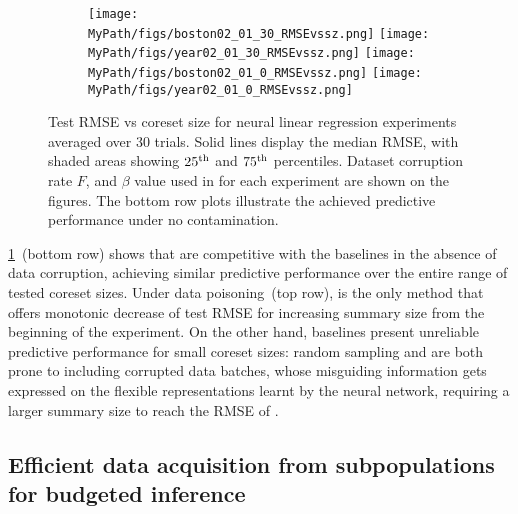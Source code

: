 \begin{figure}[t!]
	\begin{subfigure}[b]{0.9\textwidth} 
		\centering
		\texttt{[image: \\MyPath/figs/boston02\_01\_30\_RMSEvssz.png]}
		\hfill
		\texttt{[image: \\MyPath/figs/year02\_01\_30\_RMSEvssz.png]}
		\centering
		\hfill
		\texttt{[image: \\MyPath/figs/boston02\_01\_0\_RMSEvssz.png]}
		\centering
		\hfill
		\texttt{[image: \\MyPath/figs/year02\_01\_0\_RMSEvssz.png]}
	\end{subfigure}	
	\centering
	\caption{Test RMSE vs coreset size for neural linear regression experiments averaged over 30 trials. Solid lines display the median RMSE, with shaded areas showing $25\textsuperscript{th}$ and $75\textsuperscript{th}$ percentiles. Dataset corruption rate $F$, and $\beta$ value used in \bcores{} for each experiment are shown on the figures. The bottom row plots illustrate the achieved predictive performance under no contamination.}
	\label{fig:neural_plot}
\end{figure}


\cref{fig:neural_plot}~(bottom row) shows that \bcores{} are competitive with the baselines in the absence of data corruption, achieving similar predictive performance over the entire range of tested coreset sizes. Under data poisoning~(top row), \bcores{} is the only method that offers monotonic decrease of test RMSE for increasing summary size from the beginning of the experiment. On the other hand, baselines present unreliable predictive performance for small coreset sizes: random sampling and \sparsevi{} are both prone to including corrupted data batches, whose misguiding information gets expressed on the flexible representations learnt by the neural network, requiring a larger summary size to reach the RMSE of \bcores.





\subsection{Efficient data acquisition from subpopulations for budgeted inference}
\label{sec:active-selection}


